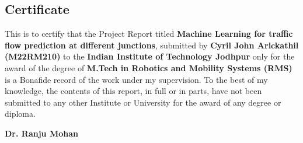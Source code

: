 
\begin{titlepage}
    \begin{flushright}
        
  
\section*{Certificate}
\justifying
This is to certify that the Project Report titled \textbf{Machine Learning for traffic flow prediction at different junctions}, submitted by \textbf{Cyril John Arickathil (M22RM210)} to the \textbf{Indian Institute of Technology Jodhpur} only for the award of the degree of \textbf{M.Tech in Robotics and Mobility Systems (RMS)} is a Bonafide record of the work under my supervision. To the best of my knowledge, the contents of this report, in full or in parts, have not been submitted to any other Institute or University for the award of any degree or diploma.
\vspace*{3\baselineskip}




{\large  \bfseries  Dr. Ranju Mohan }


\end{flushright}

\end{titlepage}
